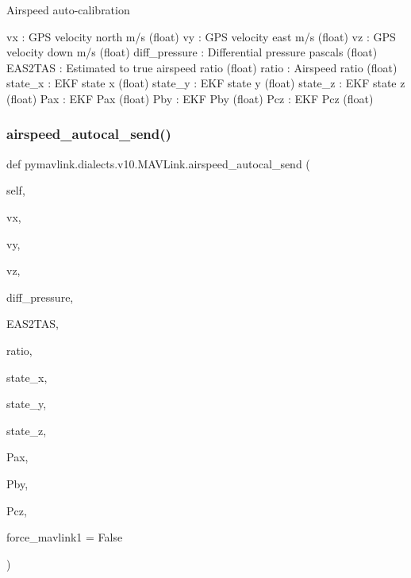 \begin{DoxyVerb}Airspeed auto-calibration

vx                        : GPS velocity north m/s (float)
vy                        : GPS velocity east m/s (float)
vz                        : GPS velocity down m/s (float)
diff_pressure             : Differential pressure pascals (float)
EAS2TAS                   : Estimated to true airspeed ratio (float)
ratio                     : Airspeed ratio (float)
state_x                   : EKF state x (float)
state_y                   : EKF state y (float)
state_z                   : EKF state z (float)
Pax                       : EKF Pax (float)
Pby                       : EKF Pby (float)
Pcz                       : EKF Pcz (float)\end{DoxyVerb}
 \mbox{\label{classpymavlink_1_1dialects_1_1v10_1_1MAVLink_a43676dc6255d03bd64c8261e4c623eaf}} 
\subsubsection{\texorpdfstring{airspeed\+\_\+autocal\+\_\+send()}{airspeed\_autocal\_send()}}
{\footnotesize\ttfamily def pymavlink.\+dialects.\+v10.\+M\+A\+V\+Link.\+airspeed\+\_\+autocal\+\_\+send (\begin{DoxyParamCaption}\item[{}]{self,  }\item[{}]{vx,  }\item[{}]{vy,  }\item[{}]{vz,  }\item[{}]{diff\+\_\+pressure,  }\item[{}]{E\+A\+S2\+T\+AS,  }\item[{}]{ratio,  }\item[{}]{state\+\_\+x,  }\item[{}]{state\+\_\+y,  }\item[{}]{state\+\_\+z,  }\item[{}]{Pax,  }\item[{}]{Pby,  }\item[{}]{Pcz,  }\item[{}]{force\+\_\+mavlink1 = {\ttfamily False} }\end{DoxyParamCaption})}

